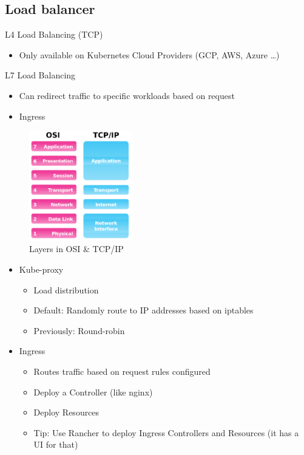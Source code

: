 \documentclass{article}
\begin{document}
\subsection{Load balancer}

L4 Load Balancing (TCP)

\begin{itemize}
    \item Only available on Kubernetes Cloud Providers (GCP, AWS, Azure …)
\end{itemize}


L7 Load Balancing

\begin{itemize}
    \item Can redirect traffic to specific workloads based on request
    \item Ingress
\end{itemize}

\begin{figure}[H]
    \centering
    \includegraphics[width=0.4\textwidth]{img/osi-tcpip.png}
    \caption{Layers in OSI \& TCP/IP}
\end{figure}


\begin{itemize}
    \item Kube-proxy
    \begin{itemize}
        \item Load distribution
        \item Default: Randomly route to IP addresses based on iptables
        \item Previously: Round-robin 
    \end{itemize}
    \item Ingress
    \begin{itemize}
        \item Routes traffic based on request rules configured
        \item Deploy a Controller (like nginx)
        \item Deploy Resources
        \item Tip: Use Rancher to deploy Ingress Controllers and Resources (it has a UI for that)
    \end{itemize}
\end{itemize}
\end{document}

